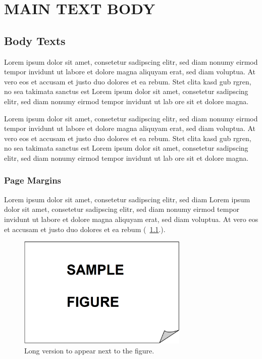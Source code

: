 \chapter{MAIN TEXT BODY}\label{ch:ch3}

\vspace{-12pt} %

\section{Body Texts}

Lorem ipsum dolor sit amet, consetetur sadipscing elitr, sed diam nonumy eirmod tempor invidunt ut labore et dolore magna aliquyam erat, sed diam voluptua. At vero eos et accusam et justo duo dolores et ea rebum. Stet clita kasd gub rgren, no sea takimata sanctus est Lorem ipsum dolor sit amet, consetetur sadipscing elitr, sed diam nonumy eirmod tempor invidunt ut lab ore sit et dolore magna.

Lorem ipsum dolor sit amet, consetetur sadipscing elitr, sed diam nonumy eirmod tempor invidunt ut labore et dolore magna aliquyam erat, sed diam voluptua. At vero eos et accusam et justo duo dolores et ea rebum. Stet clita kasd gub rgren, no sea takimata sanctus est Lorem ipsum dolor sit amet, consetetur sadipscing elitr, sed diam nonumy eirmod tempor invidunt ut lab ore sit et dolore magna.

\subsection{Page Margins}

Lorem ipsum dolor sit amet, consetetur sadipscing elitr, sed diam Lorem ipsum dolor sit amet, consetetur sadipscing elitr, sed diam nonumy eirmod tempor invidunt ut labore et dolore magna aliquyam erat, sed diam voluptua. At vero eos et accusam et justo duo dolores et ea rebum (\figurename\ \ref{fig:ch3-1}.).

\vspace{6pt} %
\begin{figure}[!ht]
      \centering
      \includegraphics[width=230pt,keepaspectratio=true]{./fig/sekil3}
      \caption[Short version for LoF]{Long version to appear next to the figure.}
      \label{fig:ch3-1}
\end{figure}
\vspace{-9pt} %

